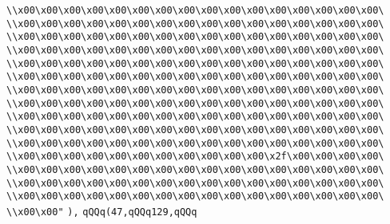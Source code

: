 \verb|\\x00\x00\x00\x00\x00\x00\x00\x00\x00\x00\x00\x00\x00\x00\x00\x00\|\newline
\verb|\\x00\x00\x00\x00\x00\x00\x00\x00\x00\x00\x00\x00\x00\x00\x00\x00\|\newline
\verb|\\x00\x00\x00\x00\x00\x00\x00\x00\x00\x00\x00\x00\x00\x00\x00\x00\|\newline
\verb|\\x00\x00\x00\x00\x00\x00\x00\x00\x00\x00\x00\x00\x00\x00\x00\x00\|\newline
\verb|\\x00\x00\x00\x00\x00\x00\x00\x00\x00\x00\x00\x00\x00\x00\x00\x00\|\newline
\verb|\\x00\x00\x00\x00\x00\x00\x00\x00\x00\x00\x00\x00\x00\x00\x00\x00\|\newline
\verb|\\x00\x00\x00\x00\x00\x00\x00\x00\x00\x00\x00\x00\x00\x00\x00\x00\|\newline
\verb|\\x00\x00\x00\x00\x00\x00\x00\x00\x00\x00\x00\x00\x00\x00\x00\x00\|\newline
\verb|\\x00\x00\x00\x00\x00\x00\x00\x00\x00\x00\x00\x00\x00\x00\x00\x00\|\newline
\verb|\\x00\x00\x00\x00\x00\x00\x00\x00\x00\x00\x00\x00\x00\x00\x00\x00\|\newline
\verb|\\x00\x00\x00\x00\x00\x00\x00\x00\x00\x00\x00\x00\x00\x00\x00\x00\|\newline
\verb|\\x00\x00\x00\x00\x00\x00\x00\x00\x00\x00\x00\x2f\x00\x00\x00\x00\|\newline
\verb|\\x00\x00\x00\x00\x00\x00\x00\x00\x00\x00\x00\x00\x00\x00\x00\x00\|\newline
\verb|\\x00\x00\x00\x00\x00\x00\x00\x00\x00\x00\x00\x00\x00\x00\x00\x00\|\newline
\verb|\\x00\x00\x00\x00\x00\x00\x00\x00\x00\x00\x00\x00\x00\x00\x00\x00\|\newline
\verb|\\x00\x00"|\newline
\verb|),|\newline
\verb|qQQq(47,qQQq129,qQQq|\newline
